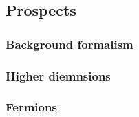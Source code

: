 \documentclass[
]{scrartcl}
\numberwithin{equation}{section}
\theoremstyle{definition}
\theoremstyle{definition}
\theoremstyle{definition}
\theoremstyle{definition}
\theoremstyle{remark}
\begin{document}
\hypertarget{prospects}{%
\subsection{Prospects}\label{prospects}}

\hypertarget{background-formalism}{%
\subsubsection{Background formalism}\label{background-formalism}}

\hypertarget{higher-diemnsions}{%
\subsubsection{Higher diemnsions}\label{higher-diemnsions}}

\hypertarget{fermions}{%
\subsubsection{Fermions}\label{fermions}}

\printbibliography
\end{document}
